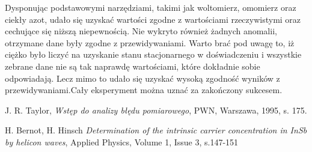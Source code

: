 \documentclass[10pt,a4paper]{article}
\begin{document}
Dysponując podstawowymi narzędziami, takimi jak woltomierz, omomierz oraz ciekły azot, udało się uzyskać wartości zgodne z wartościami rzeczywistymi oraz cechujące się niższą niepewnością. Nie wykryto również żadnych anomalii, otrzymane dane były zgodne z przewidywaniami. Warto brać pod uwagę to, iż ciężko było liczyć na uzyskanie stanu stacjonarnego w doświadczeniu i wszystkie zebrane dane nie są tak naprawdę wartościami, które dokładnie sobie odpowiadają. Lecz mimo to udało się uzyskać wysoką zgodność wyników z przewidywaniami.Cały eksperyment można uznać za zakończony sukcesem.
\begin{center}
\begin{thebibliography}{9}

 J. R. Taylor,
 \emph{Wstęp do analizy błędu pomiarowego},
 PWN, Warszawa, 1995, s. 175.

H. Bernot, H. Hinsch
 \emph{Determination of the intrinsic carrier concentration in InSb by helicon waves},
 Applied Physics, Volume 1, Issue 3, s.147-151
 
 \end{thebibliography}

\end{center}
\end{document}
